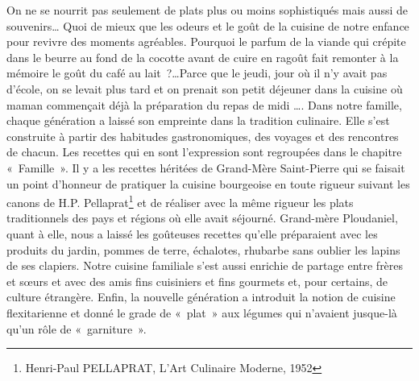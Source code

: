 On ne se nourrit pas seulement de plats plus ou moins sophistiqués mais aussi de souvenirs… Quoi de mieux que les odeurs et le goût de la cuisine de notre enfance pour revivre des moments agréables. Pourquoi le parfum de la viande qui crépite dans le beurre au fond de la cocotte avant de cuire en ragoût fait remonter à la mémoire le goût du café au lait ?\ldots Parce que le jeudi, jour où il n’y avait pas d’école, on se levait plus tard et on prenait son petit déjeuner dans la cuisine où maman commençait déjà la préparation du repas de midi \ldots.
Dans notre famille, chaque génération a laissé son empreinte dans la tradition culinaire. Elle s’est construite à partir des habitudes gastronomiques, des voyages et des rencontres de chacun. Les recettes qui en sont l’expression sont regroupées dans le chapitre « Famille ». Il y a les recettes héritées de Grand-Mère Saint-Pierre qui se faisait un point d’honneur de pratiquer la cuisine bourgeoise en toute rigueur suivant les canons de H.P. Pellaprat\footnote{Henri-Paul PELLAPRAT, L’Art Culinaire Moderne, 1952} et de réaliser avec la même rigueur les plats traditionnels des pays et régions où elle avait séjourné. Grand-mère Ploudaniel, quant à elle, nous a laissé les goûteuses recettes qu’elle préparaient avec les produits du jardin, pommes de terre, échalotes, rhubarbe sans oublier les lapins de ses clapiers. Notre cuisine familiale s’est aussi enrichie de partage entre frères et sœurs et avec des amis fins cuisiniers et fins gourmets et, pour certains, de culture étrangère. Enfin, la nouvelle génération a introduit la notion de cuisine flexitarienne et donné le grade de « plat » aux légumes qui n’avaient jusque-là qu’un rôle de « garniture ». 
